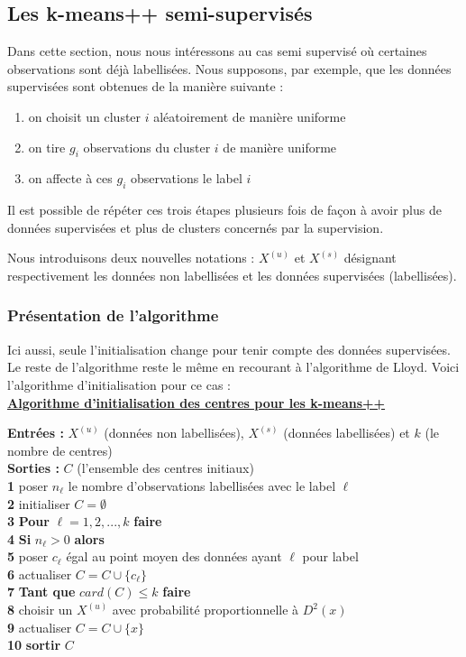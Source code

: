 \documentclass[12pt,a4paper]{book}
\newcommand{\1}{\mathds{1}}
\begin{document}
\subsection{Les k-means++ semi-supervisés}

Dans cette section, nous nous intéressons au cas semi supervisé où certaines observations sont déjà labellisées. Nous supposons, par exemple, que les données supervisées sont obtenues de la manière suivante :
\begin{enumerate}
	\item on choisit un cluster $i$ aléatoirement de manière uniforme
	\item on tire $g_i$ observations du cluster $i$ de manière uniforme
	\item on affecte à ces $g_i$ observations le label $i$
\end{enumerate}
Il est possible de répéter ces trois étapes plusieurs fois de façon à avoir plus de données supervisées et plus de clusters concernés par la supervision.

Nous introduisons deux nouvelles notations : $X^{(u)}$ et $X^{(s)}$ désignant respectivement les données non labellisées et les données supervisées (labellisées). 
	
\subsubsection{Présentation de l'algorithme}

Ici aussi, seule l'initialisation change pour tenir compte des données supervisées. Le reste de l'algorithme reste le même en recourant à l'algorithme de Lloyd. Voici l'algorithme d'initialisation pour ce cas : \\

\noindent \textbf{\underline{Algorithme d'initialisation des centres pour les k-means++}}\label{algo_ss_kmeans_pp}

\noindent \textbf{Entrées : } $X^{(u)}$ (données non labellisées), $X^{(s)}$ (données labellisées) et $k$ (le nombre de centres)\\
\noindent \textbf{Sorties : } $C$ (l'ensemble des centres initiaux) \\
\textbf{1} poser $n_{\ell}$ le nombre d'observations labellisées avec le label $\ell$\\
\textbf{2} initialiser $C=\emptyset$\\
\textbf{3} \textbf{Pour} $\ell = 1,2,...,k$ \textbf{faire} \\
\textbf{4} \indent \textbf{Si} $n_{\ell} > 0$ \textbf{alors}\\
\textbf{5} \indent \indent poser $c_\ell$ égal au point moyen des données ayant $\ell$ pour label\\
\textbf{6} \indent \indent actualiser $C = C \cup \{c_\ell \}$\\
\textbf{7} \textbf{Tant que } $card(C) \leq k$ \textbf{faire}\\
\textbf{8} \indent choisir un $X^{(u)}$ avec probabilité proportionnelle à $D^2(x)$\\
\textbf{9} \indent actualiser $C = C \cup \{x \}$\\
\textbf{10} \textbf{sortir} $C$ \\
\end{document}
